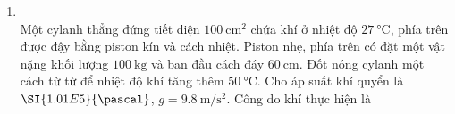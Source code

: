 \begin{enumerate}[label=\bfseries Câu \arabic*:, leftmargin=1.7cm]
\item {}\\
Một cylanh thẳng đứng tiết diện $\SI{100}{\centi\meter^2}$ chứa khí ở nhiệt độ $\SI{27}{\celsius}$, phía trên được đậy bằng piston kín và cách nhiệt. Piston nhẹ, phía trên có đặt một vật nặng khối lượng $\SI{100}{\kilogram}$ và ban đầu cách đáy $\SI{60}{\centi\meter}$. Đốt nóng cylanh một cách từ từ để nhiệt độ khí tăng thêm $\SI{50}{\celsius}$. Cho áp suất khí quyển là $\SI{1.01E5}{\pascal}$, $g=\SI{9.8}{\meter/\second^2}$. Công do khí thực hiện là 


\end{enumerate}
